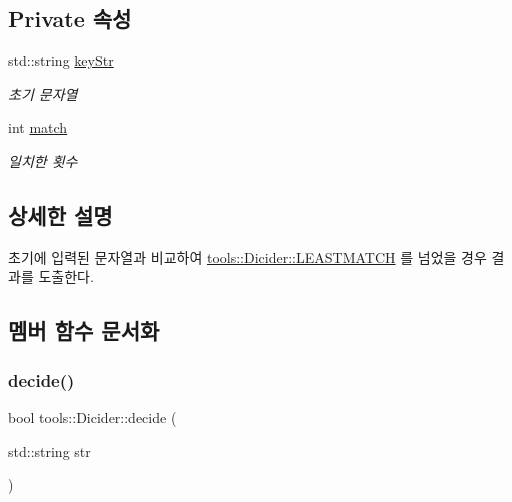 \subsection*{Private 속성}
\begin{DoxyCompactItemize}
\item 
\mbox{\label{classtools_1_1_dicider_ad5934d4a2abed460c22ea2b6313bdb5f}} 
std\+::string \hyperlink{classtools_1_1_dicider_ad5934d4a2abed460c22ea2b6313bdb5f}{key\+Str}
\begin{DoxyCompactList}\small\item\em 초기 문자열 \end{DoxyCompactList}\item 
\mbox{\label{classtools_1_1_dicider_acb9cec03e38fc8609c48f1acc5fb934d}} 
int \hyperlink{classtools_1_1_dicider_acb9cec03e38fc8609c48f1acc5fb934d}{match}
\begin{DoxyCompactList}\small\item\em 일치한 횟수 \end{DoxyCompactList}\end{DoxyCompactItemize}


\subsection{상세한 설명}
초기에 입력된 문자열과 비교하여 \hyperlink{classtools_1_1_dicider_afdc1fb561a2ed8037d0fa87b69a7792d}{tools\+::\+Dicider\+::\+L\+E\+A\+S\+T\+M\+A\+T\+CH} 를 넘었을 경우 결과를 도출한다. 

\subsection{멤버 함수 문서화}
\mbox{\label{classtools_1_1_dicider_a7340ce8845ca163e4bcddd73be54a0c9}} 
\subsubsection{\texorpdfstring{decide()}{decide()}}
{\footnotesize\ttfamily bool tools\+::\+Dicider\+::decide (\begin{DoxyParamCaption}\item[{std\+::string}]{str }\end{DoxyParamCaption})}



